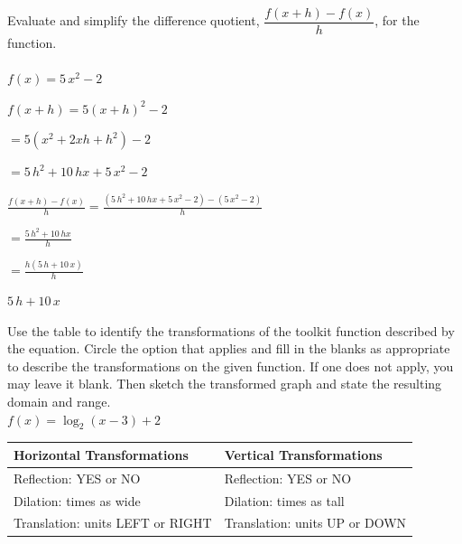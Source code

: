 \documentclass[11pt]{exam}
\begin{document}
\addpoints

\noprintanswers

\blankpage

\thispagestyle{empty}


\newpage



\begin{questions}

\question[10] Evaluate and simplify the difference quotient, $\dfrac{f(x+h)-f(x)}{h}$, for the function.\\ \\
\(f(x) = 5 \, x^{2} - 2\)

%
\begin{solution}
\(f(x+h) = 5(x+h)^2 - 2\) 

 \(= 5(x^2 + 2xh + h^2) - 2\) 

 \(= 5 \, h^{2} + 10 \, h x + 5 \, x^{2} - 2\) 

 \(\displaystyle{\frac{f(x+h)-f(x)}{h} = \frac{ (5 \, h^{2} + 10 \, h x + 5 \, x^{2} - 2) - (5 \, x^{2} - 2) }{h}}\) 

 \(=\displaystyle{ \frac{ 5 \, h^{2} + 10 \, h x }{h}}\) 

 \(= \displaystyle{ \frac{ h(5 \, h + 10 \, x) }{h}}\) 

 \(\boxed{ 5 \, h + 10 \, x }\)
\end{solution}
\answerline


\newpage

\question[8] Use the table to identify the transformations of the toolkit function described by the equation. Circle the option that applies and fill in the blanks as appropriate to describe the transformations on the given function. If one does not apply, you may leave it blank. Then sketch the transformed graph and state the resulting domain and range.\\

\(f(x) = \log_{2}(x - 3) + 2\)


\renewcommand{\arraystretch}{2.5}
\begin{tabular}{|l|l|}
\hline
\textbf{Horizontal Transformations} & \textbf{Vertical Transformations} \\ \hline
Reflection: YES or NO & Reflection: YES or NO \\ \hline
Dilation: \underline{\hspace{2cm}} times as wide & Dilation: \underline{\hspace{2cm}} times as tall \\ \hline
Translation: \underline{\hspace{2cm}} units LEFT or RIGHT & Translation: \underline{\hspace{2cm}} units UP or DOWN \\ \hline
\end{tabular}


\end{questions}
\end{document}
